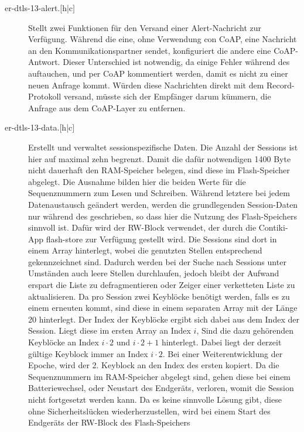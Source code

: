 \begin{description}
  \item[er-dtls-13-alert.{$[$h|c$]$}] Stellt zwei Funktionen für den Versand einer Alert-Nachricht zur Verfügung.
					Während die eine, ohne Verwendung con CoAP, eine Nachricht an den Kommunikationspartner sendet,
					konfiguriert die andere eine CoAP-Antwort. Dieser Unterschied ist notwendig, da einige Fehler während
					des  auftauchen, und per CoAP kommentiert werden, damit es nicht zu einer neuen Anfrage kommt.
					Würden diese Nachrichten direkt mit dem Record-Protokoll versand, müsste sich der Empfänger darum kümmern,
					die Anfrage aus dem CoAP-Layer zu entfernen.
  \item[er-dtls-13-data.{$[$h|c$]$}] Erstellt und verwaltet sessionspezifische Daten. Die Anzahl der Sessions ist hier auf maximal zehn begrenzt.
					Damit die dafür notwendigen 1400 Byte nicht dauerhaft den RAM-Speicher belegen, sind diese im Flash-Speicher
					abgelegt. Die Ausnahme bilden hier die beiden Werte für die Sequenznummern zum Lesen und Schreiben.
					Während letztere bei jedem Datenaustausch geändert werden, werden die grundlegenden Session-Daten nur während
					des  geschrieben, so dass hier die Nutzung des Flash-Speichers sinnvoll ist. Dafür wird der RW-Block
					verwendet, der durch die Contiki-App flash-store zur Verfügung gestellt wird. Die Sessions sind dort in einem
					Array hinterlegt, wobei die genutzten Stellen entsprechend gekennzeichnet sind. Dadurch werden bei der Suche
					nach Sessions unter Umständen auch leere Stellen durchlaufen, jedoch bleibt der Aufwand erspart die Liste zu
					defragmentieren oder Zeiger einer verketteten Liste zu aktualisieren. Da pro Session zwei Keyblöcke benötigt werden,
					falls es zu einem erneuten  kommt, sind diese in einem separaten Array mit der Länge 20 hinterlegt.
					Der Index der Keyblöcke ergibt sich dabei aus dem Index der Session. Liegt diese im ersten Array an Index $ i $,
					Sind die dazu gehörenden Keyblöcke an Index $ i\cdot2 $ und $ i\cdot2+1 $ hinterlegt. Dabei liegt der derzeit gültige
					Keyblock immer an Index $ i\cdot2 $. Bei einer Weiterentwicklung der Epoche, wird der 2. Keyblock an den Index
					des ersten kopiert. Da die Sequenznummern im RAM-Speicher abgelegt sind, gehen diese bei einem Batteriewechsel,
					oder Neustart des Endgeräts, verloren, womit die Session nicht fortgesetzt werden kann. Da es keine sinnvolle Lösung gibt,
					diese ohne Sicherheitslücken wiederherzustellen, wird bei einem Start des Endgeräts der RW-Block des Flash-Speichers

\end{description}
